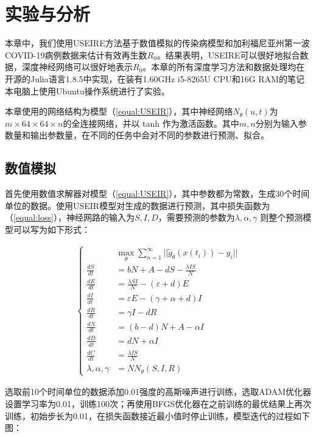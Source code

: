 \newpage
\section{实验与分析}
本章中，我们使用USEIRE方法基于数值模拟的传染病模型和加利福尼亚州第一波COVID-19病例数据来估计有效再生数$R_0$。结果表明，USEIRE可以很好地拟合数据，深度神经网络可以很好地表示$R_0$。本章的所有深度学习方法和数据处理均在开源的Julia语言1.8.5中实现，在装有1.60GHz i5-8265U CPU和16G RAM的笔记本电脑上使用Ubuntu操作系统进行了实验。

本章使用的网络结构为模型（\ref{equal:USEIR}），其中神经网络$N_\theta(u,t)$为$m\times 64\times 64\times n$的全连接网络，并以 tanh 作为激活函数。其中$m,n$分别为输入参数量和输出参数量，在不同的任务中会对不同的参数进行预测、拟合。
\subsection{数值模拟}
首先使用数值求解器对模型（\ref{equal:USEIR}），其中参数都为常数，生成30个时间单位的数据。使用USEIR模型对生成的数据进行预测，其中损失函数为（\ref{equal:loss}），神经网路的输入为$S,I,D$，需要预测的参数为$\lambda , \alpha, \gamma$ 则整个预测模型可以写为如下形式：

\begin{gather}
    \left\{
    \begin{aligned}
    & \mathop{max}\limits_\theta \sum_{n = 1}^{\infty} ||\widetilde{g}_\theta(x(t_i))-y_i||  \\
    \frac{dS}{dt} & =  bN + A-dS-\frac{\lambda IS}{N} \\
    \frac{dE}{dt} & =  \frac{\lambda SI}{N} - (\varepsilon +d)E\\
    \frac{dI}{dt} & =  \varepsilon E - (\gamma +\alpha +d)I\\
    \frac{dR}{dt} & =  \gamma I - dR \\
    \frac{dN}{dt} & = (b-d)N+A-\alpha I \\
    \frac{dD}{dt} & = dN+\alpha I \\
    \frac{dC}{dt} & = \frac{\lambda IS}{N} \\
    \lambda , \alpha, \gamma & ={NN}_\theta (S,I,R)
    \end{aligned}
    \right.
    \label{equal:1}
\end{gather}

选取前10个时间单位的数据添加0.01强度的高斯噪声进行训练，选取ADAM优化器设置学习率为0.01，训练100次；再使用BFGS优化器在之前训练的最优结果上再次训练，初始步长为0.01，在损失函数接近最小值时停止训练，模型迭代的过程如下图：

